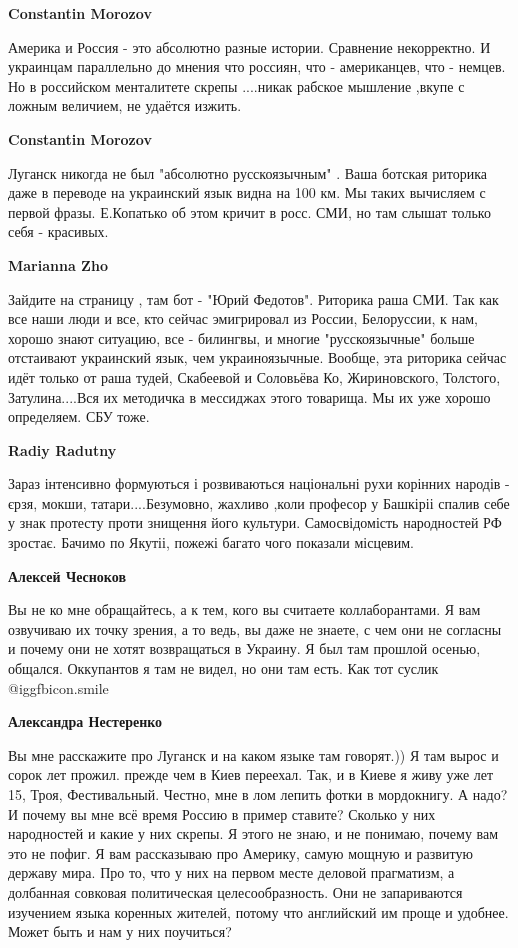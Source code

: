 \begin{itemize}
\begin{itemize}
\textbf{Constantin Morozov} 

Америка и Россия - это абсолютно разные истории. Сравнение некорректно. И
украинцам параллельно до мнения что россиян, что - американцев, что - немцев.
Но в российском менталитете скрепы ....никак рабское мышление ,вкупе с ложным
величием, не удаётся изжить.

\textbf{Constantin Morozov} 

Луганск никогда не был "абсолютно русскоязычным" . Ваша ботская риторика даже в
переводе на украинский язык видна на 100 км. Мы таких вычисляем с первой фразы.
Е.Копатько об этом кричит в росс. СМИ, но там слышат только себя - красивых.

\textbf{Marianna Zho} 

Зайдите на страницу , там бот - "Юрий Федотов". Риторика раша СМИ. Так как все
наши люди и все, кто сейчас эмигрировал из России, Белоруссии, к нам, хорошо
знают ситуацию, все - билингвы, и многие "русскоязычные" больше отстаивают
украинский язык, чем украиноязычные. Вообще, эта риторика сейчас идёт только от
раша тудей, Скабеевой и Соловьёва Ко, Жириновского, Толстого, Затулина....Вся
их методичка в мессиджах этого товарища. Мы их уже хорошо определяем. СБУ тоже.

\textbf{Radiy Radutny} 

Зараз інтенсивно формуються і розвиваються національні рухи корінних народів -
єрзя, мокши, татари....Безумовно, жахливо ,коли професор у Башкіріі спалив себе
у знак протесту проти знищення його культури. Самосвідомість народностей РФ
зростає. Бачимо по Якутіі, пожежі багато чого показали місцевим.

\textbf{Алексей Чесноков} 

Вы не ко мне обращайтесь, а к тем, кого вы считаете коллаборантами. Я вам
озвучиваю их точку зрения, а то ведь, вы даже не знаете, с чем они не согласны
и почему они не хотят возвращаться в Украину. Я был там прошлой осенью,
общался. Оккупантов я там не видел, но они там есть. Как тот суслик
@igg{fbicon.smile} 

\textbf{Александра Нестеренко} 

Вы мне расскажите про Луганск и на каком языке там говорят.)) Я там вырос и
сорок лет прожил. прежде чем в Киев переехал. Так, и в Киеве я живу уже лет 15,
Троя, Фестивальный. Честно, мне в лом лепить фотки в мордокнигу. А надо? И
почему вы мне всё время Россию в пример ставите? Сколько у них народностей и
какие у них скрепы. Я этого не знаю, и не понимаю, почему вам это не пофиг. Я
вам рассказываю про Америку, самую мощную и развитую державу мира. Про то, что
у них на первом месте деловой прагматизм, а долбанная совковая политическая
целесообразность. Они не запариваются изучением языка коренных жителей, потому
что английский им проще и удобнее. Может быть и нам у них поучиться?


\end{itemize}
\end{itemize}
